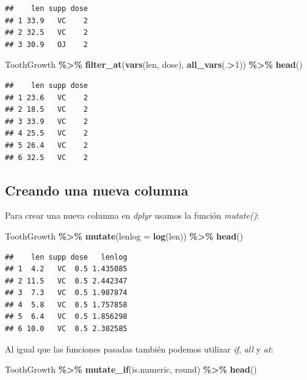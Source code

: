 \documentclass[
]{book}
\newenvironment{Shaded}{\begin{snugshade}}{\end{snugshade}}
\newcommand{\AttributeTok}[1]{\textcolor[rgb]{0.13,0.29,0.53}{#1}}
\newcommand{\DecValTok}[1]{\textcolor[rgb]{0.00,0.00,0.81}{#1}}
\newcommand{\FunctionTok}[1]{\textcolor[rgb]{0.13,0.29,0.53}{\textbf{#1}}}
\newcommand{\NormalTok}[1]{#1}
\newcommand{\SpecialCharTok}[1]{\textcolor[rgb]{0.81,0.36,0.00}{\textbf{#1}}}
\begin{document}
\begin{verbatim}
##    len supp dose
## 1 33.9   VC    2
## 2 32.5   VC    2
## 3 30.9   OJ    2
\end{verbatim}

\begin{Shaded}
\begin{Highlighting}[]
\NormalTok{ToothGrowth }\SpecialCharTok{\%\textgreater{}\%} \FunctionTok{filter\_at}\NormalTok{(}\FunctionTok{vars}\NormalTok{(len, dose), }\FunctionTok{all\_vars}\NormalTok{(.}\SpecialCharTok{\textgreater{}}\DecValTok{1}\NormalTok{)) }\SpecialCharTok{\%\textgreater{}\%} \FunctionTok{head}\NormalTok{()}
\end{Highlighting}
\end{Shaded}

\begin{verbatim}
##    len supp dose
## 1 23.6   VC    2
## 2 18.5   VC    2
## 3 33.9   VC    2
## 4 25.5   VC    2
## 5 26.4   VC    2
## 6 32.5   VC    2
\end{verbatim}

\hfill\break

\subsection{Creando una nueva columna}\label{creando-una-nueva-columna-1}

\hfill\break
Para crear una nueva columna en \emph{dplyr} usamos la función \emph{mutate()}:

\begin{Shaded}
\begin{Highlighting}[]
\NormalTok{ToothGrowth }\SpecialCharTok{\%\textgreater{}\%} \FunctionTok{mutate}\NormalTok{(}\AttributeTok{lenlog =} \FunctionTok{log}\NormalTok{(len)) }\SpecialCharTok{\%\textgreater{}\%} \FunctionTok{head}\NormalTok{()}
\end{Highlighting}
\end{Shaded}

\begin{verbatim}
##    len supp dose   lenlog
## 1  4.2   VC  0.5 1.435085
## 2 11.5   VC  0.5 2.442347
## 3  7.3   VC  0.5 1.987874
## 4  5.8   VC  0.5 1.757858
## 5  6.4   VC  0.5 1.856298
## 6 10.0   VC  0.5 2.302585
\end{verbatim}

\hfill\break
Al igual que las funciones pasadas también podemos utilizar \emph{if}, \emph{all} y \emph{at}:

\begin{Shaded}
\begin{Highlighting}[]
\NormalTok{ToothGrowth }\SpecialCharTok{\%\textgreater{}\%} \FunctionTok{mutate\_if}\NormalTok{(is.numeric, round) }\SpecialCharTok{\%\textgreater{}\%} \FunctionTok{head}\NormalTok{()}
\end{Highlighting}
\end{Shaded}
\end{document}
